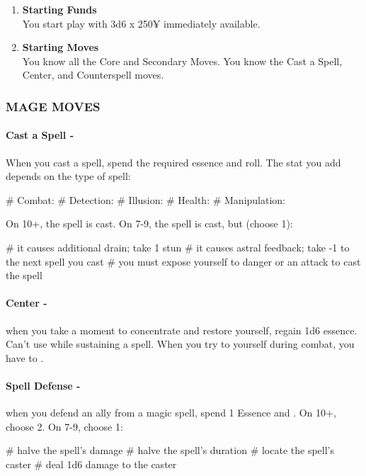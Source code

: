 \begin{enumerate}
    \item \textbf{Starting Funds} \\
    You start play with 3d6 x 250¥ immediately available.
    
    \item \textbf{Starting Moves} \\
    You know all the Core and Secondary Moves. You know the Cast a Spell, Center, and Counterspell moves.
\end{enumerate}

\subsubsection{MAGE MOVES}
\paragraph{Cast a Spell -} When you cast a spell, spend the required essence and roll. The stat you add depends on the type of spell:
    \begin{easylist}
        # Combat: 
        # Detection: 
        # Illusion: 
        # Health: 
        # Manipulation: 
    \end{easylist}        
On 10+, the spell is cast. On 7-9, the spell is cast, but (choose 1):
    \begin{easylist}
        # it causes additional drain; take 1 stun
        # it causes astral feedback; take -1 to the next spell you cast
        # you must expose yourself to danger or an attack to cast the spell
    \end{easylist}

\paragraph{Center -} when you take a moment to concentrate and restore yourself, regain 1d6 essence. Can't use while sustaining a spell. When you try to  yourself during combat, you have to .

\paragraph{Spell Defense -} when you defend an ally from a magic spell, spend 1 Essence and . On 10+, choose 2. On 7-9, choose 1:
    \begin{easylist}
        # halve the spell’s damage
        # halve the spell’s duration
        # locate the spell’s caster
        # deal 1d6 damage to the caster
    \end{easylist}

